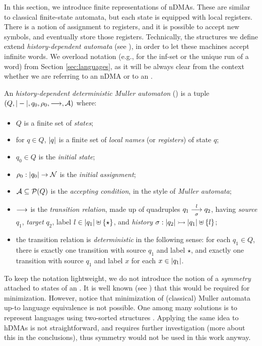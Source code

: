 
In this section, we introduce finite representations of nDMAs. These are similar to classical finite-state automata, but each state is equipped with local registers. There is a notion of assignment to registers, and it is possible to accept new symbols, and eventually store those registers. Technically, the structures we define extend \emph{history-dependent automata} (see \cite{TODO}), in order to let these machines accept infinite words. We overload notation (e.g., for the inf-set or the unique run of a word) from Section \ref{sec:languages}, as it will be always clear from the context whether we are referring to an nDMA or to an \hdma.

\begin{definition}\label{def:hdma}
 An \emph{history-dependent deterministic Muller automaton} (\hdma) is a tuple $(Q,|-|,q_0,\rho_0,\overset{}{\underset{}{\longrightarrow}},\mathcal{A})$
 where:
 \begin{itemize}
  \item $Q$ is a finite set of \emph{states};
  \item for $q \in Q$, $|q|$ is a finite set of \emph{local names} (or \emph{registers}) of state $q$;
  \item $q_0 \in Q$ is the \emph{initial state};
  \item $\rho_0 : |q_0| \to \mathcal{N}$ is the \emph{initial assignment};
  \item $\mathcal{A} \subseteq \mathcal{P}(Q)$ is the \emph{accepting condition}, in the style of \emph{Muller automata};
  \item $\overset{}{\underset{}{\longrightarrow}}$ is the \emph{transition relation}, made up of quadruples $q_1 \overset{l}{\underset{\sigma}{\longrightarrow}} q_2$, having \emph{source} $q_1$, \emph{target} $q_2$, label $l \in |q_1| \uplus \{\star\}$, and \emph{history} $\sigma : |q_2| \rightarrowtail |q_1| \uplus \{l\}$;
  \item the transition relation is \emph{deterministic} in the following sense: for each $q_1 \in Q$,   there is exactly one transition with source $q_1$ and label $\star$, and exactly one transition with source $q_1$ and label $x$ for each $x \in |q_1|$.
 \end{itemize}
\end{definition}
%

\begin{remark}
To keep the notation lightweight, we do not introduce the notion of a \emph{symmetry} attached to states of an \hdma. It is well known (see \cite{PistoreThesis?}) that this would be required for minimization. However, notice that minimization of (classical) Muller automata up-to language equivalence is not possible. One among many solutions is to represent languages using two-sorted structures \cite{CV12}. Applying the same idea to hDMAs is not straightforward, and requires further investigation (more about this in the conclusions), thus symmetry would not be used in this work anyway. 
\label{rem:no-symmetry}
\end{remark}

